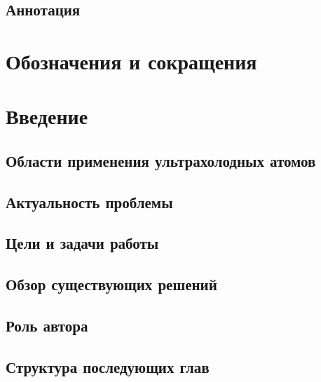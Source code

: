 

\newpage
\subsection*{Аннотация}





\unewpage
\section*{Обозначения и сокращения}




\unewpage
\section{Введение}

\subsection{Области применения ультрахолодных атомов}


\unewpage
\subsection{Актуальность проблемы}


\unewpage
\subsection{Цели и задачи работы}


\unewpage
\subsection{Обзор существующих решений}


\unewpage
\subsection{Роль автора}

\subsection{Структура последующих глав}








